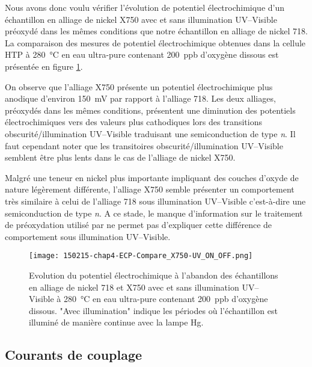 \begin{refsection}
    Nous avons donc voulu vérifier l’évolution de potentiel électrochimique d’un échantillon en alliage de nickel X750
    avec et sans illumination UV--Visible préoxydé dans les mêmes conditions que notre échantillon en alliage de nickel
    718. La comparaison des mesures de potentiel électrochimique obtenues dans la cellule HTP à \SI{280}{\degreeCelsius} en eau ultra-pure
    contenant 200~ppb d’oxygène dissous est présentée en figure \ref{fig:ch4_comp_ECP_718_750}.
    
    On observe que l’alliage X750 présente un potentiel électrochimique plus anodique d’environ \SI{150}{\milli\volt} par rapport à
    l’alliage 718. Les deux alliages, préoxydés dans les mêmes conditions, présentent une diminution des potentiels
    électrochimiques vers des valeurs plus cathodiques lors des transitions obscurité/illumination UV--Visible traduisant
    une semiconduction de type \emph{n}. Il faut cependant noter que les transitoires obscurité/illumination UV--Visible
    semblent être plus lents dans le cas de l’alliage de nickel X750.
    
    Malgré une teneur en nickel plus importante impliquant des couches d’oxyde de nature légèrement différente,
    l’alliage X750 semble présenter un comportement très similaire à celui de l’alliage 718 sous illumination UV--Visible
    c’est-à-dire une semiconduction de type \emph{n}. A ce stade, le manque d’information sur le traitement de préoxydation
    utilisé par \citet{Kim2010} ne permet pas d’expliquer cette différence de comportement sous illumination UV--Visible.

    \begin{figure}[H]
        \centering
        \texttt{[image: 150215-chap4-ECP-Compare\_X750-UV\_ON\_OFF.png]}
        \caption{Evolution du potentiel électrochimique à l’abandon des échantillons en alliage de nickel 718 et X750
        avec et sans illumination UV--Visible à \SI{280}{\degreeCelsius} en eau ultra-pure contenant 200~ppb d’oxygène
        dissous. "Avec
    illumination" indique les périodes où l’échantillon est illuminé de manière continue avec la lampe Hg.}
        \label{fig:ch4_comp_ECP_718_750}
    \end{figure}



    \subsection{Courants de couplage}\label{subsec:ch4_oxygen_ZRA}


\end{refsection}
